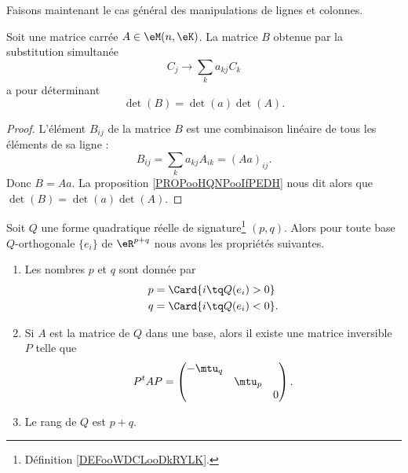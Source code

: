 Faisons maintenant le cas général des manipulations de lignes et colonnes.

\begin{proposition}     \label{PROPooSLLGooSZjQrv}
	Soit une matrice carrée \( A\in \eM(n,\eK)\). La matrice \( B\) obtenue par la substitution simultanée
	\begin{equation}
		C_j\to \sum_ka_{kj}C_k
	\end{equation}
	a pour déterminant
	\begin{equation}
		\det(B)=\det(a)\det(A).
	\end{equation}
\end{proposition}

\begin{proof}
	L'élément \( B_{ij}\) de la matrice \( B\) est une combinaison linéaire de tous les éléments de sa ligne :
	\begin{equation}
		B_{ij}=\sum_ka_{kj}A_{ik}=(Aa)_{ij}.
	\end{equation}
	Donc \( B=Aa\). La proposition \ref{PROPooHQNPooIfPEDH} nous dit alors que \( \det(B)=\det(a)\det(A)\).
\end{proof}

\begin{theorem}   \label{ThoQFVsBCk}
	Soit $Q$ une forme quadratique réelle de signature\footnote{Définition \ref{DEFooWDCLooDkRYLK}.} \( (p,q)\). Alors pour toute base \( Q\)-orthogonale \( \{ e_i \}\) de \( \eR^{p+q}\) nous avons les propriétés suivantes.
	\begin{enumerate}
		\item       \label{ITEMooCFQHooRWfmpT}
		      Les nombres \( p\) et \( q\) sont donnée par
		      \begin{subequations}
			      \begin{align}
				      p & =\Card\{ i\tq Q(e_i)>0 \}             \label{SUBEQooONWLooNsgmQY} \\
				      q & =\Card\{ i\tq Q(e_i)<0 \}.        \label{SUBEQooFKXMooOVwvKR}
			      \end{align}
		      \end{subequations}
		\item       \label{ITEMooWLPVooSTOOjL}
		      Si \( A\) est la matrice de \( Q\) dans une base, alors il existe une matrice inversible \( P\) telle que
		      \begin{equation}
			      P^tAP=\begin{pmatrix}
				      -\mtu_q &        &   \\
				              & \mtu_p &   \\
				              &        & 0
			      \end{pmatrix}.
		      \end{equation}
		\item       \label{ITEMooGOHCooPrNQwm}
		      Le rang de \( Q\) est \( p+q\).
	\end{enumerate}
\end{theorem}

